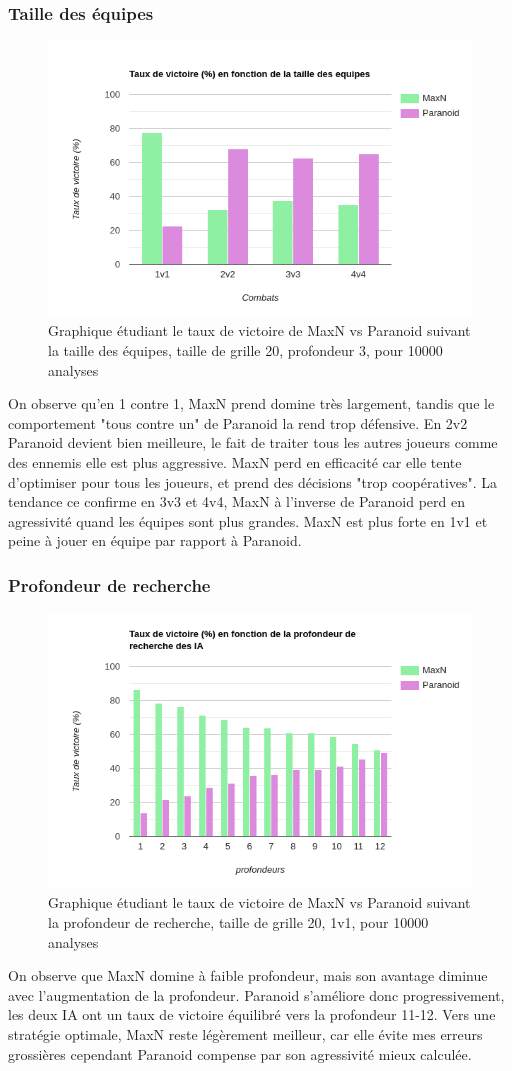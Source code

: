 \documentclass[a4paper,12pt]{article}
\begin{document}
\subsubsection{Taille des équipes}
\begin{figure}[h!]
		\centering	\includegraphics[width=0.5\linewidth]{TauxVictoireEquipe}
		\caption{Graphique étudiant le taux de victoire de MaxN vs Paranoid suivant la taille des équipes, taille de grille 20, profondeur 3, pour 10000 analyses}
	\end{figure}
On observe qu'en 1 contre 1, MaxN prend domine très largement, tandis que le comportement "tous contre un" de Paranoid la rend trop défensive.
En 2v2 Paranoid devient bien meilleure, le fait de traiter tous les autres joueurs comme des ennemis elle est plus aggressive. MaxN perd en efficacité car elle tente d'optimiser pour tous les joueurs, et prend des décisions "trop coopératives".
La tendance ce confirme en 3v3 et 4v4, MaxN à l'inverse de Paranoid perd en agressivité quand les équipes sont plus grandes.
MaxN est plus forte en 1v1 et peine à jouer en équipe par rapport à Paranoid.

\newpage

\subsubsection{Profondeur de recherche}
\begin{figure}[h!]
		\centering
\includegraphics[width=0.5\linewidth]{TauxVictoireProfondeur}
		\caption{Graphique étudiant le taux de victoire de MaxN vs Paranoid suivant la profondeur de recherche, taille de grille 20, 1v1, pour 10000 analyses}
	\end{figure}
On observe que MaxN domine à faible profondeur, mais son avantage diminue avec l'augmentation de la profondeur. Paranoid s’améliore donc progressivement, les deux IA ont un taux de victoire équilibré vers la profondeur 11-12. Vers une stratégie optimale, MaxN reste légèrement meilleur, car elle évite mes erreurs grossières cependant Paranoid compense par son agressivité mieux calculée.
\end{document}
